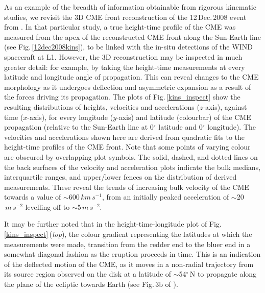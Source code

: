 \documentclass[preprint2]{aastex}
\begin{document}
As an example of the breadth of information obtainable from rigorous kinematic studies, we revisit the 3D CME front reconstruction of the 12\,Dec.\,2008 event from \citealt{2010NatCo...1E..74B}. In that particular study, a true height-time profile of the CME was measured from the apex of the reconstructed CME front along the Sun-Earth line (see Fig.\,\ref{12dec2008kins}), to be linked with the in-situ detections of the WIND spacecraft at L1. However, the 3D reconstruction may be inspected in much greater detail: for example, by taking the height-time measurements at every latitude and longitude angle of propagation. This can reveal changes to the CME morphology as it undergoes deflection and asymmetric expansion as a result of the forces driving its propagation. The plots of Fig.\,\ref{kins_inspect} show the resulting distributions of heights, velocities and accelerations ($z$-axis), against time ($x$-axis), for every longitude ($y$-axis) and latitude (colourbar) of the CME propagation (relative to the Sun-Earth line at 0$^{\circ}$ latitude and 0$^{\circ}$ longitude). The velocities and accelerations shown here are derived from quadratic fits to the height-time profiles of the CME front. Note that some points of varying colour are obscured by overlapping plot symbols. The solid, dashed, and dotted lines on the back surfaces of the velocity and acceleration plots indicate the bulk medians, interquartile ranges, and upper/lower fences on the distribution of derived measurements. These reveal the trends of increasing bulk velocity of the CME towards a value of $\sim$600$\,km\,s^{-1}$, from an initially peaked acceleration of $\sim$20$\,m\,s^{-2}$ levelling off to $\sim$5$\,m\,s^{-2}$.

It may be further noted that in the height-time-longitude plot of Fig.\,\ref{kins_inspect}\,(\emph{top}), the colour gradient representing the latitudes at which the measurements were made, transition from the redder end to the bluer end in a somewhat diagonal fashion as the eruption proceeds in time. This is an indication of the deflected motion of the CME, as it moves in a non-radial trajectory from its source region observed on the disk at a latitude of $\sim$54$^{\circ}$\,N to propagate along the plane of the ecliptic towards Earth (see Fig.\,3b of \citealt{2010NatCo...1E..74B}).

\subsubsection{}
\end{document}
